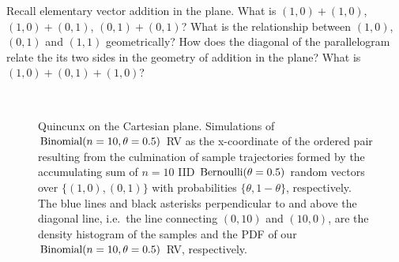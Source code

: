 \begin{classwork}
Recall elementary vector addition in the plane.  What is $(1,0)+(1,0)$, $(1,0)+(0,1)$, $(0,1)+(0,1)$?  What is the relationship between $(1,0)$, $(0,1)$ and $(1,1)$ geometrically? How does the diagonal of the parallelogram relate the its two sides in the geometry of addition in the plane?  What is  $(1,0)+(0,1)+(1,0)$?
\end{classwork}

\begin{figure}[htpb]
\caption{Quincunx on the Cartesian plane.  Simulations of $\mbox{{\rm Binomial}}(n=10,\theta=0.5)$ RV as the x-coordinate of the ordered pair resulting from the culmination of sample trajectories formed by the accumulating sum of $n=10$ IID $\mbox{{\rm Bernoulli}}(\theta=0.5)$ random vectors over $\{(1,0),(0,1)\}$ with probabilities $\{\theta,1-\theta\}$, respectively.  The blue lines and black asterisks perpendicular to and above the diagonal line, i.e.~the line connecting $(0,10)$ and $(10,0)$, are the density histogram of the samples and the PDF of our $\mbox{{\rm Binomial}}(n=10,\theta=0.5)$ RV, respectively.\label{F:BinomQuincunxn10r10r1000}}
\centering
\mbox{ \hspace{-2cm}
	    }
\end{figure}

